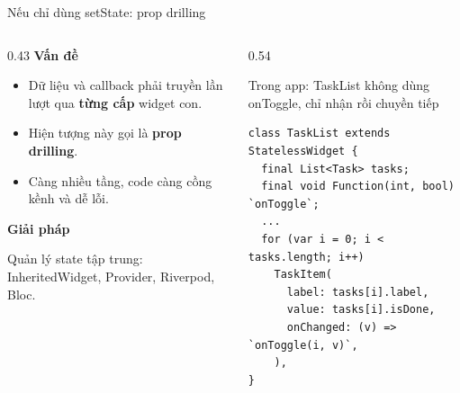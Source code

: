 \documentclass[aspectratio=169,11pt]{beamer}
\newcommand{\ma}[1]{{\ttfamily\small #1}}
\newcommand{\nhanma}[1]{{\scriptsize\color{xam}#1\par}\vspace{0.8mm}}
\begin{document}
\begin{frame}[fragile]{Nếu chỉ dùng setState: prop drilling}
  \begin{columns}[T,onlytextwidth]
    \begin{column}{0.43\textwidth}
      \textbf{\color{chinh}Vấn đề}
      \begin{itemize}
        \item Dữ liệu và callback phải truyền lần lượt qua \textbf{từng cấp} widget con.
        \item Hiện tượng này gọi là \textbf{prop drilling}.
        \item Càng nhiều tầng, code càng cồng kềnh và dễ lỗi.
      \end{itemize}
      \vspace{1.5mm}
      \textbf{\color{chinh}Giải pháp}\par\vspace{0.8mm}
      Quản lý state tập trung: \ma{InheritedWidget}, Provider, Riverpod, Bloc.
    \end{column}
    \begin{column}{0.54\textwidth}
      \nhanma{Trong app: \ma{\scriptsize TaskList} không dùng \ma{\scriptsize onToggle}, chỉ nhận rồi chuyền tiếp}
\begin{lstlisting}
class TaskList extends StatelessWidget {
  final List<Task> tasks;
  final void Function(int, bool) `onToggle`;
  ...
  for (var i = 0; i < tasks.length; i++)
    TaskItem(
      label: tasks[i].label,
      value: tasks[i].isDone,
      onChanged: (v) => `onToggle(i, v)`,
    ),
}
\end{lstlisting}
      \vspace{2.5mm}
      \centering
    \end{column}
  \end{columns}
\end{frame}
\end{document}
